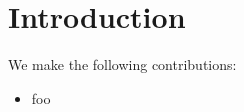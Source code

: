 \section{Introduction}\label{sec:intro}

We make the following contributions:
%
\begin{itemize}
\item foo
\end{itemize}
